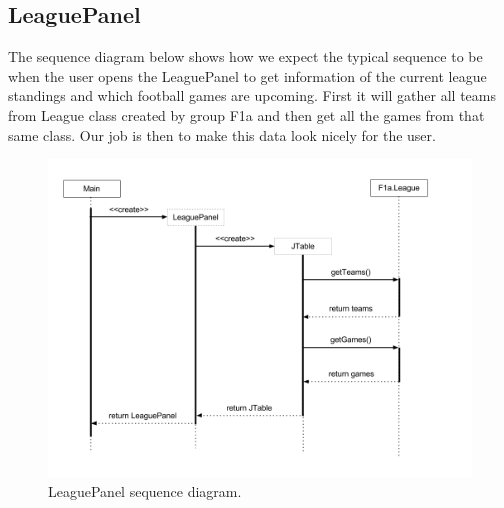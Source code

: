 \documentclass{article}
\begin{document}
\subsection{LeaguePanel}
The sequence diagram below shows how we expect the typical sequence to be when the user opens the LeaguePanel to get information of the current league standings and which football games are upcoming. First it will gather all teams from League class created by group F1a and then get all the games from that same class. Our job is then to make this data look nicely for the user.
\begin{figure}[H]
\centering
\includegraphics[width=\textwidth]{img/seq_diagram_2.png}
\caption{LeaguePanel sequence diagram.}
\end{figure}
\end{document}

